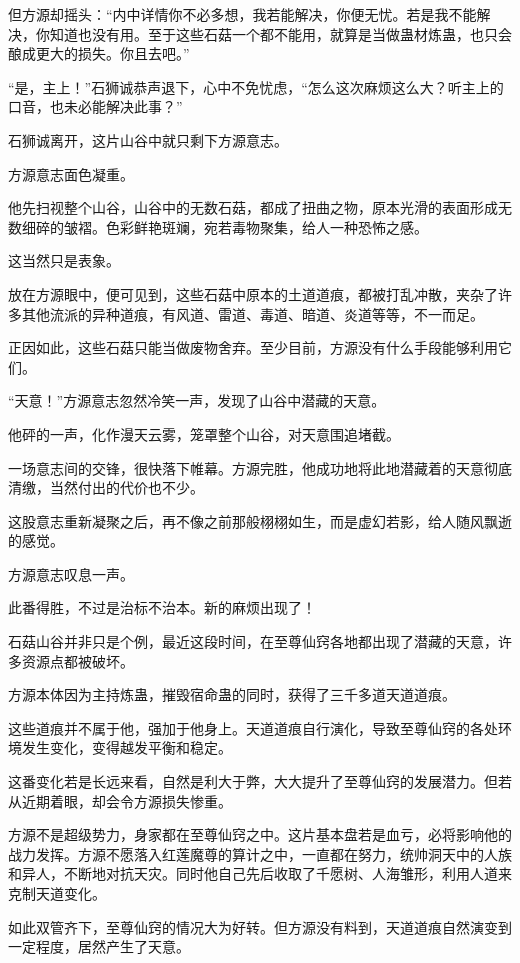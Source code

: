 \begin{this_body}
但方源却摇头：“内中详情你不必多想，我若能解决，你便无忧。若是我不能解决，你知道也没有用。至于这些石菇一个都不能用，就算是当做蛊材炼蛊，也只会酿成更大的损失。你且去吧。”

“是，主上！”石狮诚恭声退下，心中不免忧虑，“怎么这次麻烦这么大？听主上的口音，也未必能解决此事？”

石狮诚离开，这片山谷中就只剩下方源意志。

方源意志面色凝重。

他先扫视整个山谷，山谷中的无数石菇，都成了扭曲之物，原本光滑的表面形成无数细碎的皱褶。色彩鲜艳斑斓，宛若毒物聚集，给人一种恐怖之感。

这当然只是表象。

放在方源眼中，便可见到，这些石菇中原本的土道道痕，都被打乱冲散，夹杂了许多其他流派的异种道痕，有风道、雷道、毒道、暗道、炎道等等，不一而足。

正因如此，这些石菇只能当做废物舍弃。至少目前，方源没有什么手段能够利用它们。

“天意！”方源意志忽然冷笑一声，发现了山谷中潜藏的天意。

他砰的一声，化作漫天云雾，笼罩整个山谷，对天意围追堵截。

一场意志间的交锋，很快落下帷幕。方源完胜，他成功地将此地潜藏着的天意彻底清缴，当然付出的代价也不少。

这股意志重新凝聚之后，再不像之前那般栩栩如生，而是虚幻若影，给人随风飘逝的感觉。

方源意志叹息一声。

此番得胜，不过是治标不治本。新的麻烦出现了！

石菇山谷并非只是个例，最近这段时间，在至尊仙窍各地都出现了潜藏的天意，许多资源点都被破坏。

方源本体因为主持炼蛊，摧毁宿命蛊的同时，获得了三千多道天道道痕。

这些道痕并不属于他，强加于他身上。天道道痕自行演化，导致至尊仙窍的各处环境发生变化，变得越发平衡和稳定。

这番变化若是长远来看，自然是利大于弊，大大提升了至尊仙窍的发展潜力。但若从近期着眼，却会令方源损失惨重。

方源不是超级势力，身家都在至尊仙窍之中。这片基本盘若是血亏，必将影响他的战力发挥。方源不愿落入红莲魔尊的算计之中，一直都在努力，统帅洞天中的人族和异人，不断地对抗天灾。同时他自己先后收取了千愿树、人海雏形，利用人道来克制天道变化。

如此双管齐下，至尊仙窍的情况大为好转。但方源没有料到，天道道痕自然演变到一定程度，居然产生了天意。


\end{this_body}
